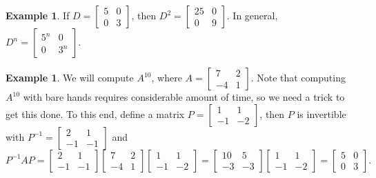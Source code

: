 \documentclass[12pt,letterpaper]{book}
\numberwithin{equation}{section}
\theoremstyle{definition}
\newtheorem{example}[thm]{\textbf{Example}}
\begin{document}
\begin{example} If $D=\left[\begin{array}{rr} 5 & 0 \\ 0 & 3
\end{array}\right]$, then $D^2=\left[\begin{array}{cr} 25 & 0 \\ 0 &
9
\end{array}\right]$. In general, $D^n=\left[\begin{array}{cc} 5^n & 0 \\ 0 &
3^n
\end{array}\right]$.
\end{example}

\begin{example}\label{first diago} We will compute $A^{10}$, where $A=\left[\begin{array}{rr} 7
& 2 \\ -4 & 1 \end{array}\right]$. Note that computing $A^{10}$ with bare hands requires considerable amount of time, so we need a trick to get this done. To this end, define a
matrix $P=\left[\begin{array}{rr} 1 & 1 \\ -1 & -2
\end{array}\right]$, then $P$ is invertible with $P^{-1}=\left[\begin{array}{rr} 2 & 1 \\ -1 &
-1 \end{array}\right]$ and
$$P^{-1}AP=\left[\begin{array}{rr} 2 & 1 \\ -1 &
-1 \end{array}\right]\left[\begin{array}{rr} 7 & 2 \\ -4 & 1
\end{array}\right]\left[\begin{array}{rr} 1 & 1 \\ -1 & -2
\end{array}\right]=\left[\begin{array}{rr} 10 & 5 \\ -3 &
-3 \end{array}\right]\left[\begin{array}{rr} 1 & 1 \\ -1 & -2
\end{array}\right]=\left[\begin{array}{rr} 5 &0 \\
0 & 3 \end{array}\right].$$

\end{example}
\end{document}

